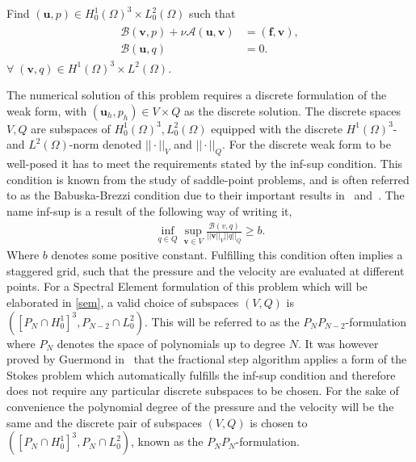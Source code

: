 Find $(\mathbf{u}, p) \in H^1_0(\Omega)^3\times L^2_0(\Omega)$ such that 
\begin{align}
    \begin{split}
           \mathcal{B}(\mathbf{v},p) 
         +\nu\mathcal{A}(\mathbf{u},\mathbf{v}) &= (\mathbf{f},\mathbf{v}), \\
        \mathcal{B}(\mathbf{u},q) &= 0.
    \end{split}
	\label{eq:NSweak}
\end{align}
$\forall\; (\mathbf{v}, q) \in H^1(\Omega)^3\times L^2(\Omega)$.
%

The numerical solution of this problem requires a discrete formulation of the weak form, with $(\mathbf{u}_h,p_h)\in V\times Q$
as the discrete solution. The discrete spaces $V,Q$ are subspaces of $ H_0^1(\Omega)^{3},L^2_0(\Omega)$ equipped with the discrete
$ H^1(\Omega) ^3$- and $L^2(\Omega)$-norm denoted $||\cdot||_V$ and $||\cdot||_Q$. 
For the discrete weak form to be well-posed it has to meet the requirements stated by the
inf-sup condition. This condition is known from the study of saddle-point problems, and 
is often referred to as the Babuska-Brezzi condition due to their important results
in~\cite{Babuska} and~\cite{Brezzi}. The name inf-sup is a result of the
following way of writing it,
%
\begin{align}
    \inf_{q\in Q}\sup_{\mathbf{v}\in V}\frac{\mathcal{B}(v,q)}{||\mathbf{v}||_V||q||_Q} \ge b.
    \label{eq:infsup}
\end{align}
%
Where $b$ denotes some positive constant. Fulfilling this condition often implies
a staggered grid, such that the pressure and the velocity are evaluated at different points. 
For a Spectral Element formulation of this problem which will be elaborated in \cref{sem},
a valid choice of subspaces $(V,Q)$ is $(\left[  P_N\cap H^1_0\right]^3,P_{N-2} \cap L^{2}_{0})$. This will be referred to as the 
$P_NP_{N-2}$-formulation where $P_N$ denotes the space of polynomials up to degree $N$.
It was however proved by Guermond in~\cite{GuermondPnPn} that the fractional step algorithm applies a 
form of the Stokes problem which automatically fulfills the inf-sup condition and therefore does not require any particular 
discrete subspaces to be chosen. For the sake of convenience the polynomial degree of the pressure and the velocity will be 
the same and the discrete pair of subspaces $(V,Q)$ is chosen to $(\left[ P_N\cap H^1_0 \right]^3,P_{N} \cap L^{2}_{0})$,
known as the $P_NP_N$-formulation.

